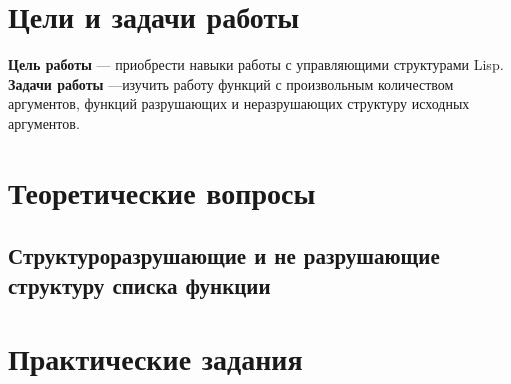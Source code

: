 \chapter{Цели и задачи работы}
\textbf{Цель работы} --- приобрести навыки работы с управляющими структурами Lisp.
\textbf{Задачи работы} ---изучить работу функций с произвольным количеством аргументов, функций
разрушающих и неразрушающих структуру исходных аргументов.

\chapter{Теоретические вопросы}
\section{Структуроразрушающие и не разрушающие структуру списка функции}

\chapter{Практические задания}
